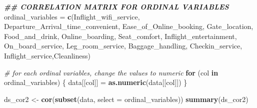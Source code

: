 \documentclass[
]{article}
\newenvironment{Shaded}{\begin{snugshade}}{\end{snugshade}}
\newcommand{\AttributeTok}[1]{\textcolor[rgb]{0.13,0.29,0.53}{#1}}
\newcommand{\CommentTok}[1]{\textcolor[rgb]{0.56,0.35,0.01}{\textit{#1}}}
\newcommand{\ControlFlowTok}[1]{\textcolor[rgb]{0.13,0.29,0.53}{\textbf{#1}}}
\newcommand{\DocumentationTok}[1]{\textcolor[rgb]{0.56,0.35,0.01}{\textbf{\textit{#1}}}}
\newcommand{\FunctionTok}[1]{\textcolor[rgb]{0.13,0.29,0.53}{\textbf{#1}}}
\newcommand{\NormalTok}[1]{#1}
\newcommand{\OtherTok}[1]{\textcolor[rgb]{0.56,0.35,0.01}{#1}}
\newcommand{\StringTok}[1]{\textcolor[rgb]{0.31,0.60,0.02}{#1}}
\begin{document}
\begin{Shaded}
\begin{Highlighting}[]
\DocumentationTok{\#\# CORRELATION MATRIX FOR ORDINAL VARIABLES}
\NormalTok{ordinal\_variables }\OtherTok{=} \FunctionTok{c}\NormalTok{(}\StringTok{\textquotesingle{}Inflight\_wifi\_service\textquotesingle{}}\NormalTok{, }\StringTok{\textquotesingle{}Departure\_Arrival\_time\_convenient\textquotesingle{}}\NormalTok{, }\StringTok{\textquotesingle{}Ease\_of\_Online\_booking\textquotesingle{}}\NormalTok{, }\StringTok{\textquotesingle{}Gate\_location\textquotesingle{}}\NormalTok{, }\StringTok{\textquotesingle{}Food\_and\_drink\textquotesingle{}}\NormalTok{, }\StringTok{\textquotesingle{}Online\_boarding\textquotesingle{}}\NormalTok{, }\StringTok{\textquotesingle{}Seat\_comfort\textquotesingle{}}\NormalTok{, }\StringTok{\textquotesingle{}Inflight\_entertainment\textquotesingle{}}\NormalTok{, }\StringTok{\textquotesingle{}On\_board\_service\textquotesingle{}}\NormalTok{, }\StringTok{\textquotesingle{}Leg\_room\_service\textquotesingle{}}\NormalTok{, }\StringTok{\textquotesingle{}Baggage\_handling\textquotesingle{}}\NormalTok{, }\StringTok{\textquotesingle{}Checkin\_service\textquotesingle{}}\NormalTok{, }\StringTok{\textquotesingle{}Inflight\_service\textquotesingle{}}\NormalTok{,}\StringTok{\textquotesingle{}Cleanliness\textquotesingle{}}\NormalTok{)}

\CommentTok{\# for each ordinal variables, change the values to numeric}
\ControlFlowTok{for}\NormalTok{ (col }\ControlFlowTok{in}\NormalTok{ ordinal\_variables) \{}
\NormalTok{  data[[col]] }\OtherTok{=} \FunctionTok{as.numeric}\NormalTok{(data[[col]])}
\NormalTok{\}}

\NormalTok{ds\_cor2 }\OtherTok{\textless{}{-}} \FunctionTok{cor}\NormalTok{(}\FunctionTok{subset}\NormalTok{(data, }\AttributeTok{select =}\NormalTok{ ordinal\_variables))}
\FunctionTok{summary}\NormalTok{(ds\_cor2)}
\end{Highlighting}
\end{Shaded}
\end{document}
